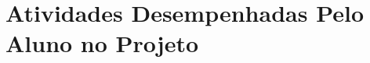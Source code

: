 \section[Atividades Desempenhadas Pelo Aluno no Projeto]{Atividades Desempenhadas Pelo Aluno no Projeto}





